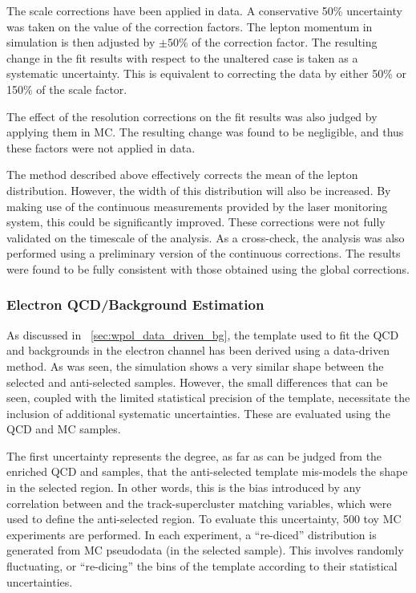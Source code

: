 The scale corrections have been applied in data. A conservative 50\% uncertainty
was taken on the value of the correction factors. The lepton momentum in
simulation is then adjusted by $\pm 50\%$ of the correction factor. The
resulting change in the fit results with respect to the unaltered case is taken
as a systematic uncertainty. This is equivalent to correcting the data by either
50\% or 150\% of the scale factor.

The effect of the resolution corrections on the fit results was also judged by
applying them in \ac{MC}. The resulting change was found to be negligible,
and thus these factors were not applied in data.

The method described above effectively corrects the mean of the lepton \Pt
distribution. However, the width of this distribution will also be increased. By
making use of the continuous measurements provided by the laser monitoring
system, this could be significantly improved. These corrections were not fully
validated on the timescale of the analysis. As a cross-check, the analysis was
also performed using a preliminary version of the continuous corrections. The
results were found to be fully consistent with those obtained using the global
corrections.

\subsubsection{Electron \ac{QCD}/\gammajets Background Estimation}
\label{sec:wpol_syst_ele_bgest}
As discussed in \sec~\ref{sec:wpol_data_driven_bg}, the template used to fit the
\ac{QCD} and \gammajets backgrounds in the electron channel has been derived
using a data-driven method. As was seen, the simulation shows a very similar \LP
shape between the selected and anti-selected samples. However, the small
differences that can be seen, coupled with the limited statistical precision of
the template, necessitate the inclusion of additional systematic
uncertainties. These are evaluated using the \ac{QCD} and \gammajets \ac{MC}
samples.

The first uncertainty represents the degree, as far as can be judged from the
enriched \ac{QCD} and \gammajets samples, that the anti-selected template
mis-models the \LP shape in the selected region. In other words, this is the
bias introduced by any correlation between \LP and the track-supercluster
matching variables, which were used to define the anti-selected region. To
evaluate this uncertainty, 500 toy \ac{MC} experiments are performed. In each
experiment, a ``re-diced'' \LP distribution is generated from \ac{MC} pseudodata
(in the selected sample). This involves randomly fluctuating, or ``re-dicing''
the bins of the \LP template according to their statistical uncertainties.

